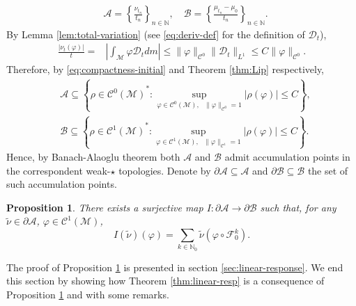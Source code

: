 \documentclass{amsart}
\numberwithin{equation}{section}
\newtheorem{proposition}[theorem]{Proposition}
\newcommand\vf{\varphi}
\renewcommand{\le}{\leqslant}
\newcommand\cC{{\mathcal C}}
\newcommand\cF{{\mathcal F}}
\newcommand\cM{{\mathcal M}}
\newcommand\bN{{\mathbb N}}
\newcommand{\Deriv}{\mathcal D}
\begin{document}
\begin{equation}\label{eq:A-Bsets}
  \begin{split}
  &  \mathscr A = \left\{\frac{\nu_{t_n}}{t_n}\right\}_{n \in \bN}, \quad \mathscr B = \left\{\frac{\mu_{t_n} - \mu_0}{t_n}\right\}_{n \in \bN}.
  \end{split}
\end{equation}
By Lemma \ref{lem:total-variation} (see \eqref{eq:deriv-def} for the definition of  \(\Deriv_t\)),
\begin{equation}\label{eq:compactness-initial}
\begin{split}
\frac{|\nu_t(\vf)|}{t} =&  \left|\int_{\cM} \vf \Deriv_t dm\right| \le  \|\vf\|_{\cC^0}\|\Deriv_t\|_{L^1} \le C\|\vf\|_{\cC^0}.
\end{split}
\end{equation}
Therefore, by \eqref{eq:compactness-initial} and Theorem \ref{thm:Lip} respectively,
\[
\begin{split}
  &\mathscr A \subseteq \left\{\rho \in {\cC^0(\cM)}^*: \sup_{\vf \in \cC^0(\cM), \text{ }\|\vf\|_{\cC^0} = 1}|\rho (\vf)| \le C\right\},\\
  &\mathscr B \subseteq \left\{\rho \in {\cC^1(\cM)}^*: \sup_{\vf \in \cC^1(\cM), \text{ }\|\vf\|_{\cC^1} = 1}|\rho (\vf)| \le C\right\}.
\end{split}
\]
Hence, by Banach-Alaoglu theorem both \(\mathscr A\) and \(\mathscr B\) admit accumulation points in the correspondent weak-\(\star\) topologies. Denote by \(\partial \mathscr A \subseteq \mathscr A\) and \(\partial \mathscr B \subseteq \mathscr B\) the set of such accumulation points.
\begin{proposition}
  \label{prop:linear-resp-accumulation}
  There exists a surjective map \(I: \partial \mathscr A \to \partial \mathscr B\) such that, for any \(\widetilde \nu \in \partial \mathscr A\), \(\vf \in \cC^1(\cM)\), 
 \begin{equation}
  \label{eq:linear-resp-formulas}
  I(\widetilde \nu)(\vf) = \sum_{k \in \bN_0} \widetilde \nu \left(\vf \circ \cF_0^k\right).
\end{equation}
\end{proposition}
The proof of Proposition \ref{prop:linear-resp-accumulation} is presented in section \ref{sec:linear-response}. We end this section by showing how Theorem \ref{thm:linear-resp} is a consequence of Proposition \ref{prop:linear-resp-accumulation} and with some remarks.
\end{document}
